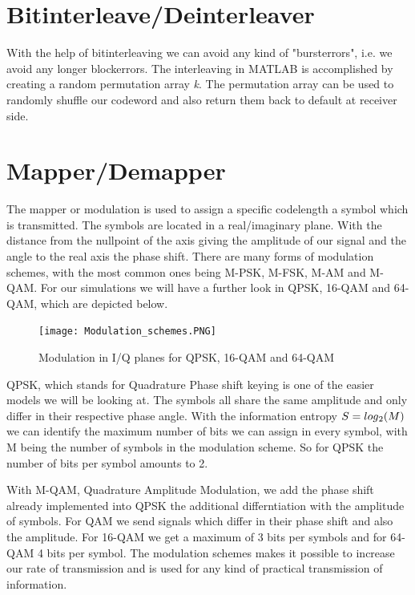 \documentclass[12pt,oneside, reqno]{report}
\begin{document}
\section{Bitinterleave/Deinterleaver}

With the help of bitinterleaving we can avoid any kind of "bursterrors", i.e. we avoid any longer blockerrors. The interleaving in MATLAB is accomplished by creating a random permutation array \textit{k}. The permutation array can be used to randomly shuffle our codeword and also return them back to default at receiver side.

\newpage

\section{Mapper/Demapper}

The mapper or modulation is used to assign a specific codelength a symbol which is transmitted. The symbols are located in a real/imaginary plane. With the distance from the nullpoint of the axis giving the amplitude of our signal and the angle to the real axis the phase shift. 
There are many forms of modulation schemes, with the most common ones being M-PSK, M-FSK, M-AM and M-QAM. For our simulations we will have a further look in QPSK, 16-QAM and 64-QAM, which are depicted below.

\begin{figure}[H]
	\centering
	\texttt{[image: Modulation\_schemes.PNG]}
	\caption{Modulation in I/Q planes for QPSK, 16-QAM and 64-QAM}
	\label{fig:Modulation}
\end{figure}

QPSK, which stands for Quadrature Phase shift keying is one of the easier models we will be looking at. The symbols all share the same amplitude and only differ in their respective phase angle. With the information entropy $S = log\textsubscript{2}(M)$ we can identify the maximum number of bits we can assign in every symbol, with M being the number of symbols in the modulation scheme. So for QPSK the number of bits per symbol amounts to 2.

With M-QAM, Quadrature Amplitude Modulation, we add the phase shift already implemented into QPSK the additional differntiation with the amplitude of symbols. For QAM we send signals which differ in their phase shift and also the amplitude.  For 16-QAM we get a maximum of 3 bits per symbols and for 64-QAM 4 bits per symbol.
The modulation schemes makes it possible to increase our rate of transmission and is used for any kind of practical transmission of information.
\end{document}
